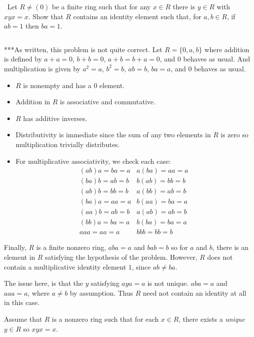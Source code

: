 \documentclass[12pt]{Qual}
\begin{document}
\begin{problem} $\,$
Let $R\not=(0)$ be a finite ring such that for any $x\in R$ there is $y\in R$ with $xyx=x$. Show that $R$ contains an identity element such that, for $a,b\in R$, if $ab=1$ then $ba=1$.
\end{problem}


\begin{solution}$\,$
\begin{mybox}
***As written, this problem is not quite correct. Let $R=\{0,a,b\}$ where addition is defined by $a+a=0$, $b+b=0$, $a+b=b+a=0$, and $0$ behaves as usual. And multiplication is given by $a^2=a$, $b^2=b$, $ab=b$, $ba=a$, and $0$ behaves as usual.

\begin{itemize}
    \item $R$ is nonempty and has a $0$ element.
    \item Addition in $R$ is associative and commutative.
    \item $R$ has additive inverses.
    \item Distributivity is immediate since the sum of any two elements in $R$ is zero so multiplication trivially distributes.
    \item For multiplicative associativity, we check each case: $$\begin{matrix}
    (ab)a=ba=a & a(ba)=aa=a\\
    (ba)b=ab=b & b(ab)=bb=b\\
    (ab)b=bb=b & a(bb)=ab=b\\
    (ba)a=aa=a & b(aa)=ba=a\\
    (aa)b=ab=b & a(ab)=ab=b\\
    (bb)a=ba=a & b(ba)=ba=a\\
    aaa=aa=a & bbb=bb=b
    \end{matrix}$$
\end{itemize}

Finally, $R$ is a finite nonzero ring, $aba=a$ and $bab=b$ so for $a$ and $b$, there is an element in $R$ satisfying the hypothesis of the problem. However, $R$ does not contain a multiplicative identity element $1$, since $ab\not=ba$.

The issue here, is that the $y$ satisfying $aya=a$ is not unique. $aba=a$ and $aaa=a$, where $a\not=b$ by assumption. Thus $R$ need not contain an identity at all in this case.
\end{mybox}

Assume that $R$ is a nonzero ring such that for each $x\in R$, there exists a \textit{unique} $y\in R$ so $xyx=x$.


\end{solution}
\end{document}

